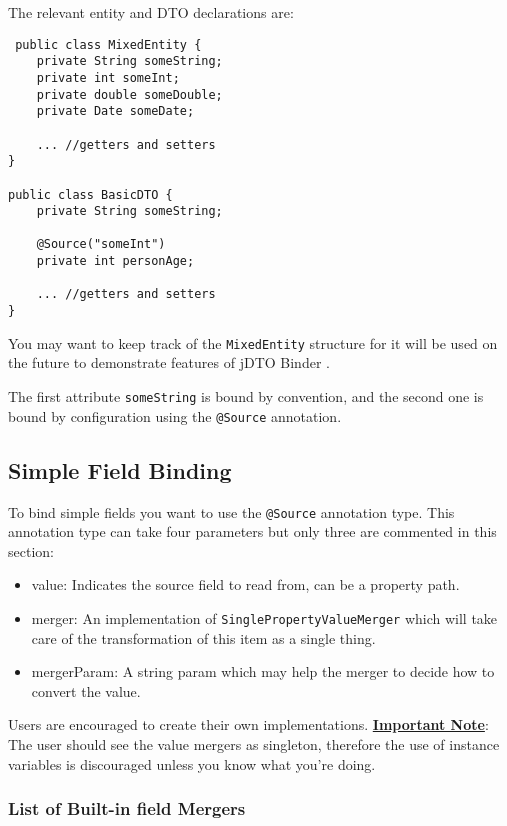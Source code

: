 \documentclass[12pt]{article}
\newcommand{\JDTO}{jDTO Binder }
\begin{document}
The relevant entity and DTO declarations are:

\begin{verbatim}
 public class MixedEntity {
    private String someString;
    private int someInt;
    private double someDouble;
    private Date someDate;
    
    ... //getters and setters
}

public class BasicDTO {
    private String someString;
    
    @Source("someInt")
    private int personAge;
    
    ... //getters and setters
}
\end{verbatim}

You may want to keep track of the \texttt{MixedEntity} structure for it will be used on the future
to demonstrate features of \JDTO.

The first attribute \texttt{someString} is bound by convention, and the second one is bound
by configuration using the \texttt{@Source} annotation.

\subsection{Simple Field Binding}

To bind simple fields you want to use the \texttt{@Source} annotation type.
This annotation type can take four parameters but only three are commented in this section:

\begin{itemize}
 \item value: Indicates the source field to read from, can be a property path.
 \item merger: An implementation of \texttt{SinglePropertyValueMerger} which will take care of the transformation of this item as a single thing.
 \item mergerParam: A string param which may help the merger to decide how to convert the value.
\end{itemize}

Users are encouraged to create their own implementations. \textbf{\underline{Important Note}}: The user should see
the value mergers as singleton, therefore the use of instance variables is discouraged unless you know what you're doing.


\subsubsection{List of Built-in field Mergers}
\end{document}
